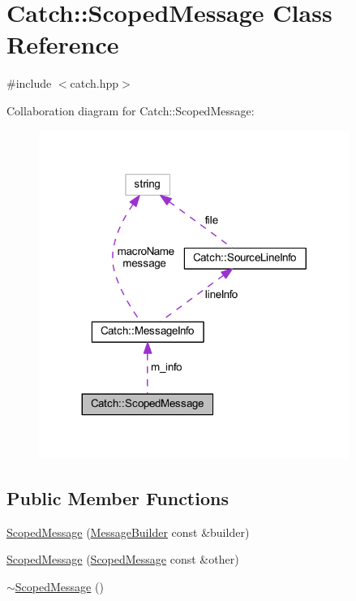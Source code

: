 \hypertarget{class_catch_1_1_scoped_message}{}\section{Catch\+:\+:Scoped\+Message Class Reference}
\label{class_catch_1_1_scoped_message}


{\ttfamily \#include $<$catch.\+hpp$>$}



Collaboration diagram for Catch\+:\+:Scoped\+Message\+:\nopagebreak
\begin{figure}[H]
\begin{center}
\leavevmode
\includegraphics[width=287pt]{class_catch_1_1_scoped_message__coll__graph}
\end{center}
\end{figure}
\subsection*{Public Member Functions}
\begin{DoxyCompactItemize}
\item 
\hyperlink{class_catch_1_1_scoped_message_a5cc59f0f2ebe840e6607f83004d49a17}{Scoped\+Message} (\hyperlink{struct_catch_1_1_message_builder}{Message\+Builder} const \&builder)
\item 
\hyperlink{class_catch_1_1_scoped_message_ae03a17fd47220d563d4abc73e7518e29}{Scoped\+Message} (\hyperlink{class_catch_1_1_scoped_message}{Scoped\+Message} const \&other)
\item 
\hyperlink{class_catch_1_1_scoped_message_a43190843f9eeb84a0b42b0bc95fdf93a}{$\sim$\+Scoped\+Message} ()
\end{DoxyCompactItemize}
